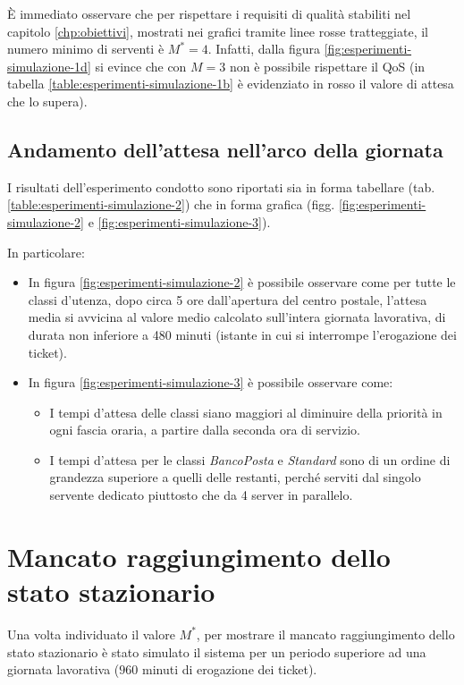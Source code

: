 È immediato osservare che per rispettare i requisiti di qualità stabiliti nel capitolo \ref{chp:obiettivi}, mostrati nei grafici tramite linee rosse tratteggiate, il numero minimo di serventi è $M^* = 4$. Infatti, dalla figura \ref{fig:esperimenti-simulazione-1d} si evince che con $M = 3$ non è possibile rispettare il QoS (in tabella \ref{table:esperimenti-simulazione-1b} è evidenziato in {\color{red}rosso} il valore di  attesa che lo supera).

\subsection*{Andamento dell'attesa nell'arco della giornata}
I risultati dell'esperimento condotto sono riportati sia in forma tabellare (tab. \ref{table:esperimenti-simulazione-2}) che in forma grafica (figg. \ref{fig:esperimenti-simulazione-2} e \ref{fig:esperimenti-simulazione-3}).

In particolare:
\begin{itemize}
\item In figura \ref{fig:esperimenti-simulazione-2} è possibile osservare come per tutte le classi d'utenza, dopo circa 5 ore dall'apertura del centro postale, l'attesa media si avvicina al valore medio calcolato sull'intera giornata lavorativa, di durata non inferiore a 480 minuti (istante in cui si interrompe l'erogazione dei ticket).
\item In figura \ref{fig:esperimenti-simulazione-3} è possibile osservare come:
\begin{itemize}
\item I tempi d'attesa delle classi siano maggiori al diminuire della priorità in ogni fascia oraria, a partire dalla seconda ora di servizio.
\item I tempi d'attesa per le classi \sr{} \textsl{BancoPosta} e \textsl{Standard} sono di un ordine di grandezza superiore a quelli delle restanti, perché serviti dal singolo servente dedicato piuttosto che da 4 server in parallelo.
\end{itemize}
\end{itemize}

\section{Mancato raggiungimento dello stato stazionario}\label{sec:esperimenti-simulazione-stazionario}
Una volta individuato il valore $M^*$, per mostrare il mancato raggiungimento dello stato stazionario è stato simulato il sistema per un periodo superiore ad una giornata lavorativa ($960$ minuti di erogazione dei ticket). 

